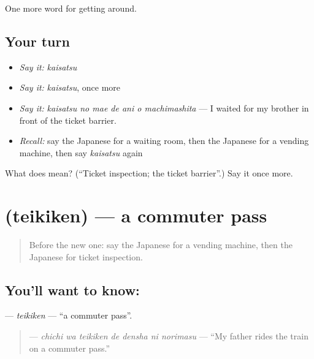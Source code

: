 \begin{grammarlens}[title={What you've built}]
One more word for getting around.
\end{grammarlens}

\subsection*{Your turn}
\begin{itemize}
\raggedright
  \item \emph{Say it:} \emph{kaisatsu}
  \item \emph{Say it:} \emph{kaisatsu}, once more
  \item \emph{Say it:} \emph{kaisatsu no mae de ani o machimashita} — I waited for my brother in front of the ticket barrier.
  \item \emph{Recall:} say the Japanese for a waiting room, then the Japanese for a vending machine, then say \emph{kaisatsu} again
\end{itemize}

\begin{tcolorbox}[breakable,colback=teal!4,colframe=teal!35!black,title={Before you move on}]
What does  mean? (\textquotedblleft{}Ticket inspection; the ticket barrier\textquotedblright{}.) Say it once more.
\end{tcolorbox}
\section[\texorpdfstring{\ja{ていきけん} (teikiken)}{ていきけん (teikiken)}]{ (teikiken) — a commuter pass}

\label{lesson:JA-C373-teikiken}



\begin{quote}
Before the new one: say the Japanese for a vending machine, then the Japanese for ticket inspection.
\end{quote}

\subsection*{You'll want to know: }
\textbf{} — \emph{teikiken} — \textquotedblleft{}a commuter pass\textquotedblright{}.

\begin{quote}
\textbf{   } — \emph{chichi wa teikiken de densha ni norimasu} — \textquotedblleft{}My father rides the train on a commuter pass.\textquotedblright{}
\end{quote}

